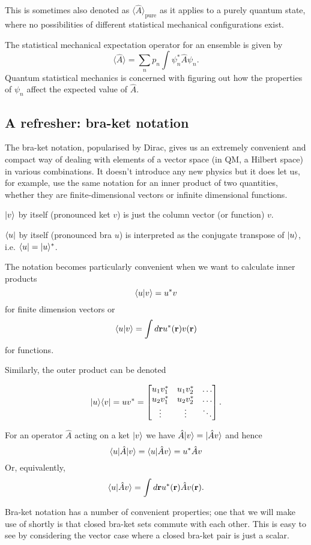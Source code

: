 This is sometimes also denoted as $\langle\hat{A}\rangle_\text{pure}$ as it applies to a purely quantum state, where no possibilities of different statistical mechanical configurations exist.

The statistical mechanical expectation operator for an ensemble is given by
$$
		\langle\hat{A}\rangle = \sum_n p_n\int\psi_n^*\hat{A}\psi_n.
$$
Quantum statistical mechanics is concerned with figuring out how the properties of $\psi_n$ affect the expected value of $\hat{A}$.

\subsection{A refresher: bra-ket notation}
The bra-ket notation, popularised by Dirac, gives us an extremely convenient and compact way of dealing with elements of a vector space (in QM, a Hilbert space) in various combinations. It doesn't introduce any new physics but it does let us, for example, use the same notation for an inner product of two quantities, whether they are finite-dimensional vectors or infinite dimensional functions.

$| v \rangle$ by itself (pronounced ket $v$) is just the column vector (or function) $v$.

$\langle u |$ by itself (pronounced bra $u$) is interpreted as the conjugate transpose of $| u \rangle$, i.e. $\langle u |=| u \rangle^*$.

The notation becomes particularly convenient when we want to calculate inner products
$$
	\langle u | v\rangle = u^*v
$$
for finite dimension vectors or 
$$
	\langle u | v\rangle =	\int d{\bf r}u^*({\bf r})v({\bf r})
$$
for functions.

Similarly, the outer product can be denoted 

$$
| u \rangle\langle v |=uv^* =
\begin{bmatrix}
    u_1v^*_1 & u_1v^*_2  & \dots \\
    u_2v^*_1 & u_2v^*_2  & \dots   \\
    \vdots & \vdots & \ddots 
\end{bmatrix}.
$$

For an operator $\hat{A}$ acting on a ket $| v \rangle$ we have $\hat{A}| v \rangle = | \hat{A}v \rangle$ and hence 
$$
	\langle u |\hat{A}| v \rangle=\langle u | \hat{A}v\rangle = u^*\hat{A}v
$$
Or, equivalently,  
$$
	\langle u | \hat{A}v\rangle = \int d{\bf r} u^*({\bf r}) \hat{A} v({\bf r}).
$$

Bra-ket notation has a number of convenient properties; one that we will make use of shortly is that closed bra-ket sets commute with each other. This is easy to see by considering the vector case where a closed bra-ket pair is just a scalar.

